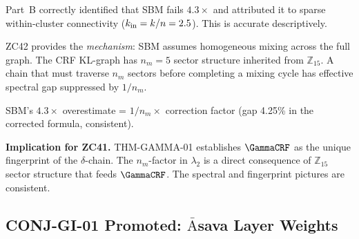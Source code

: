 \documentclass[12pt, a4paper]{article}
\providecommand{\ltwo}{\lambda_2}
\providecommand{\nm}{n_m}
\begin{document}
\begin{derivedbox}[title={FIND-ZC42-01: SBM Fails Due to
  Missing $n_m$-Sector Structure}]
Part~B correctly identified that SBM fails $4.3\times$ and
attributed it to sparse within-cluster connectivity
($k_{\rm in} = k/n = 2.5$). This is accurate descriptively.

ZC42 provides the \emph{mechanism}: SBM assumes homogeneous
mixing across the full graph. The CRF KL-graph has
$\nm = 5$ sector structure inherited from $\mathbb{Z}_{15}$.
A chain that must traverse $\nm$ sectors before completing
a mixing cycle has effective spectral gap suppressed by
$1/\nm$.

SBM's $4.3\times$ overestimate = $1/\nm \times$ correction
factor (gap 4.25\% in the corrected formula, consistent).

\textbf{Implication for ZC41.}
THM-GAMMA-01 establishes $\GammaCRF$ as the unique fingerprint
of the $\delta$-chain. The $\nm$-factor in $\ltwo$ is a direct
consequence of $\mathbb{Z}_{15}$ sector structure that feeds
$\GammaCRF$. The spectral and fingerprint pictures are
consistent.
\end{derivedbox}

\subsection{CONJ-GI-01 Promoted: \texorpdfstring{$\bar{\text{A}}$}{A}sava Layer Weights}

\end{document}
